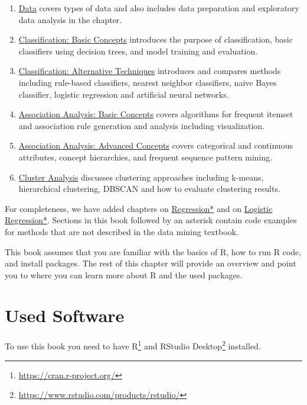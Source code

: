 \documentclass[
  notitlepage]{book}
\DeclareRobustCommand{\href}[2]{#2\footnote{\url{#1}}}
\begin{document}
\begin{enumerate}
\def\labelenumi{\arabic{enumi}.}
\setcounter{enumi}{1}
\item
  \protect\hyperlink{data}{Data} covers types of data and also includes data preparation and
  exploratory data analysis in the chapter.
\item
  \protect\hyperlink{classification-basic-concepts}{Classification: Basic Concepts} introduces the purpose of
  classification, basic classifiers using decision trees,
  and model training and evaluation.
\item
  \protect\hyperlink{classification-alternative-techniques}{Classification: Alternative Techniques} introduces and compares
  methods including rule-based classifiers, nearest neighbor
  classifiers, naive Bayes classifier, logistic regression and
  artificial neural networks.
\item
  \protect\hyperlink{association-analysis-basic-concepts}{Association Analysis: Basic Concepts} covers algorithms for
  frequent itemset and association rule generation and analysis
  including visualization.
\item
  \protect\hyperlink{association-analysis-advanced-concepts}{Association Analysis: Advanced Concepts} covers categorical and continuous
  attributes, concept hierarchies, and frequent sequence pattern mining.
\item
  \protect\hyperlink{cluster-analysis}{Cluster Analysis} discusses clustering approaches including
  k-means, hierarchical clustering, DBSCAN and how to evaluate
  clustering results.
\end{enumerate}

For completeness, we have added chapters on \protect\hyperlink{regression}{Regression*} and on
\protect\hyperlink{logistic-regression-1}{Logistic Regression*}. Sections in this book followed by an asterisk
contain code examples for methods that are not described in the data
mining textbook.

This book assumes that you are
familiar with the basics of R, how to run R code, and install packages.
The rest of this chapter will provide an overview and point you to where
you can learn more about R and the used packages.

\hypertarget{used-software}{%
\section{Used Software}\label{used-software}}

To use this book you need to have
\href{https://cran.r-project.org/}{R} and \href{https://www.rstudio.com/products/rstudio/}{RStudio
Desktop} installed.
\end{document}
